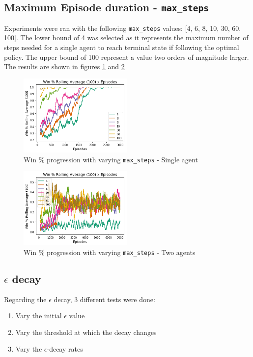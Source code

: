 \documentclass[11pt]{article}
\begin{document}
    \subsection{Maximum Episode duration - \texttt{max\_steps}}
        Experiments were ran with the following \texttt{max\_steps} values: [4, 6, 8, 10, 30, 60, 100]. The lower bound of 4 was selected as it represents the maximum number of steps needed for a single agent to reach terminal state if following the optimal policy. The upper bound of 100 represent a value two orders of magnitude larger. The results are shown in figures \ref{fig:exp5:win_percent} and \ref{fig:exp5:win_percent_two}

        \begin{figure}[h]
            \includegraphics[height=4cm]{Images/exp_5/1_win_percent.png}
            \caption{Win \% progression with varying \texttt{max\_steps} - Single agent}
            \label{fig:exp5:win_percent}
        \end{figure}

        \begin{figure}[h]
            \includegraphics[height=4cm]{Images/exp_5/2_win_percent.png}
            \caption{Win \% progression with varying \texttt{max\_steps} - Two agents}
            \label{fig:exp5:win_percent_two}
        \end{figure}

    \subsection{$\epsilon$ decay}
        Regarding the $\epsilon$ decay, 3 different tests were done:
        \begin{enumerate}
            \item Vary the initial $\epsilon$ value
            \item Vary the threshold at which the decay changes
            \item Vary the $\epsilon$-decay rates
        \end{enumerate}
\end{document}
